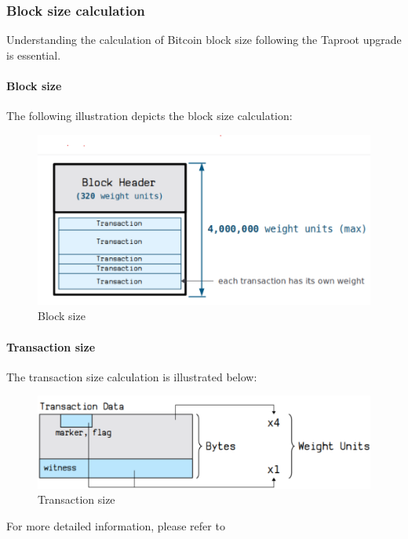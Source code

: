 \subsubsection{Block size calculation}
Understanding the calculation of Bitcoin block size following the Taproot upgrade is essential.

\paragraph{Block size} 

The following illustration depicts the block size calculation:

\begin{figure}[ht] 
    \centering  
    \includegraphics[width=0.85\columnwidth]{images/block-size.png} 
    \caption{Block size}
    \label{fig:block-size}
\end{figure}

\paragraph*{Transaction size} 

The transaction size calculation is illustrated below:

\begin{figure}[ht] 
    \centering  
    \includegraphics[width=0.85\columnwidth]{images/transaction-size.png} 
    \caption{Transaction size}
    \label{fig:transaction-size}
\end{figure}

For more detailed information, please refer to \cite{website:transaction-size}

